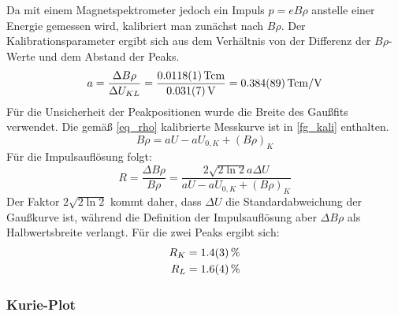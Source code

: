 \documentclass[
	a4paper,
	12pt,
	pagesize,
	ngerman
]{scrartcl}
\begin{document}
	Da mit einem Magnetspektrometer jedoch ein Impuls $p=eB\rho$ anstelle einer Energie gemessen wird, kalibriert man zunächst nach $B\rho$.
	Der Kalibrationsparameter ergibt sich aus dem Verhältnis von der Differenz der $B\rho$-Werte und dem Abstand der Peaks.
	\begin{equation}
		a = \frac{\Delta B\rho}{\Delta U_{KL}} = \frac{\SI{0.0118+-0.0001}{Tcm}}{\SI{0.031+-0.007}{V}} = \SI{0.384+-0.089}{Tcm/V}
	\end{equation}
	Für die Unsicherheit der Peakpositionen wurde die Breite des Gaußfits verwendet.
	Die gemäß \cref{eq_rho} kalibrierte Messkurve ist in \cref{fg_kali} enthalten.
	\begin{equation}
		\label{eq_rho}
		B\rho = aU-aU_{0,K}+(B\rho)_K
	\end{equation}
		Für die Impulsauflösung folgt:
	\begin{equation}
		R = \frac{\Delta B \rho}{B\rho} = \frac{2\sqrt{2\ln2}a\Delta U}{aU-aU_{0,K}+(B\rho)_K}
	\end{equation}
	Der Faktor $2\sqrt{2\ln2}$ kommt daher, dass $\Delta U$ die Standardabweichung der Gaußkurve ist, während die Definition der Impulsauflösung aber $\Delta B\rho$ als Halbwertsbreite verlangt.
	Für die zwei Peaks ergibt sich:
	\begin{align}
	R_K&= \SI{1.4+- 0.3}{\percent} \\
	R_L&= \SI{1.6+-0.4}{\percent}
	\end{align}

	\label{sec_Aufloesung}

	\subsubsection{Kurie-Plot}
\end{document}
